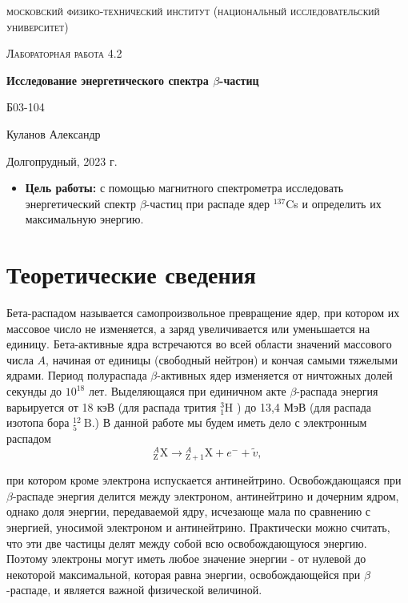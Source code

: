 \documentclass[a4paper, 12pt]{article}
\begin{document}
\begin{titlepage}
	\centering
	\vspace{5cm}
	{\scshape\LARGE московский физико-технический институт (национальный исследовательский университет) \par}
	\vspace{6cm}
	{\scshape\Large Лабораторная работа 4.2 \par}
	{\huge\bfseries Исследование энергетического спектра $\beta$-частиц \par}
	\vspace{1cm}
	\vfill
\begin{flushright}
	{\large Б03-104}\par
	\vspace{0.3cm}
	{\LARGE Куланов Александр}
\end{flushright}
	

	\vfill


	Долгопрудный, 2023 г.
\end{titlepage}

\begin{itemize}
	\item \textbf{Цель работы:} с помощью магнитного спектрометра исследовать энергетический спектр $\beta$-частиц при распаде ядер $^{137}$Cs и определить их максимальную энергию.
\end{itemize}

\section{Теоретические сведения}
Бета-распадом называется самопроизвольное превращение ядер, при котором их массовое число не изменяется, а заряд увеличивается или уменьшается на единицу. Бета-активные ядра встречаются во всей области значений массового числа $A$, начиная от единицы (свободный нейтрон) и кончая самыми тяжелыми ядрами. Период полураспада $\beta$-активных ядер изменяется от ничтожных долей секунды до $10^{18}$ лет. Выделяющаяся при единичном акте $\beta$-распада энергия варьируется от 18 кэВ (для распада трития ${ }_1^3 \mathrm{H}$ ) до 13,4 МэВ (для распада изотопа бора ${ }_5^{12} \mathrm{~B}$.)
В данной работе мы будем иметь дело с электронным распадом
\begin{equation*}
{ }_{\mathrm{Z}}^A \mathrm{X} \rightarrow{ }_{\mathrm{Z}+1}^A \mathrm{X}+e^{-}+\tilde{v},
\end{equation*}

при котором кроме электрона испускается антинейтрино. Освобождающаяся при $\beta$-распаде энергия делится между электроном, антинейтрино и дочерним ядром, однако доля энергии, передаваемой ядру, исчезающе мала по сравнению с энергией, уносимой электроном и антинейтрино. Практически можно считать, что эти две частицы делят между собой всю освобождающуюся энергию. Поэтому электроны могут иметь любое значение энергии - от нулевой до некоторой максимальной, которая равна энергии, освобождающейся при $\beta$-распаде, и является важной физической величиной.
\end{document}
